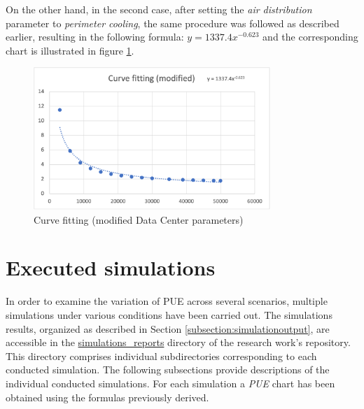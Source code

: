 On the other hand, in the second case, after setting the \emph{air distribution} parameter to \emph{perimeter cooling}, the same procedure was followed as described earlier, resulting in the following formula: \(y=1337.4x^{-0.623}\) and the corresponding chart is illustrated in figure \ref{fig:curve_fitting_modified}.
\begin{figure}[h]
    \centering
    \includegraphics[width=0.8\textwidth]{chapters/images/curve_fitting_modified.png}
    \caption{Curve fitting (modified Data Center parameters)}
    \label{fig:curve_fitting_modified}
\end{figure}

\section{Executed simulations}
In order to examine the variation of PUE across several scenarios, multiple simulations under various conditions have been carried out. The simulations results, organized as described in Section \ref{subsection:simulationoutput}, are accessible in the \href{https://github.com/vincenzo-emanuele/masters-degree-thesis/tree/main/simulation_reports}{simulations\_reports} directory of the research work's repository. This directory comprises individual subdirectories corresponding to each conducted simulation. The following subsections provide descriptions of the individual conducted simulations. For each simulation a \emph{PUE} chart has been obtained using the formulas previously derived. 


